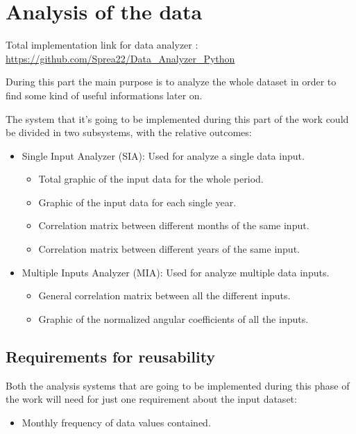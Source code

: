 
\chapter{Analysis of the data}
Total implementation link for data analyzer : \\
\url{https://github.com/Sprea22/Data_Analyzer_Python}

During this part the main purpose is to analyze the whole dataset in order to find some kind of useful informations later on. 

The system that it's going to be implemented during this part of the work could be divided in two subsystems, with the relative outcomes:
\begin{itemize}
\item Single Input Analyzer (SIA): Used for analyze a single data input.
\begin{itemize}
\item Total graphic of the input data for the whole period.
\item Graphic of the input data for each single year.
\item Correlation matrix between different months of the same input.
\item Correlation matrix between different years of the same input.
\end{itemize}
\item Multiple Inputs Analyzer (MIA): Used for analyze multiple data inputs.
\begin{itemize}
\item General correlation matrix between all the different inputs.

\item Graphic of the normalized angular coefficients of all the inputs.
\end{itemize}
\end{itemize}

\newpage

\section{Requirements for reusability}
Both the analysis systems that are going to be implemented during this phase of the work will need for just one requirement about the input dataset:
\begin{itemize}
\item Monthly frequency of data values contained.
\end{itemize}

